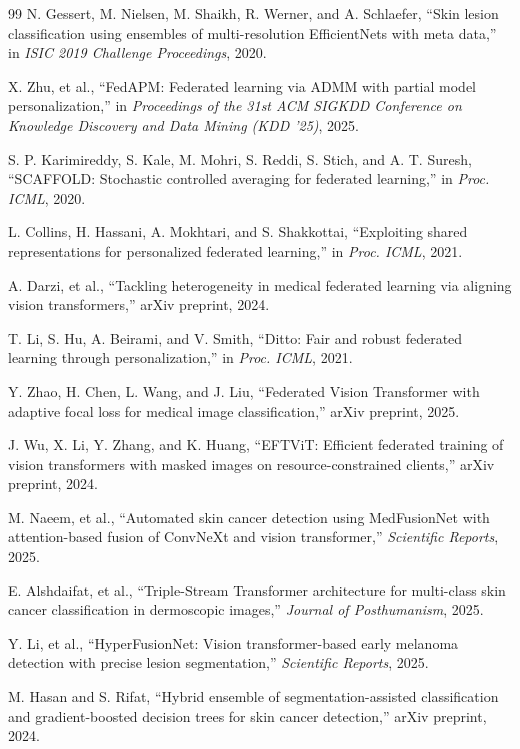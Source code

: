 \documentclass[utf8]{FrontiersinHarvard} %
\begin{document}
\begin{thebibliography}{99}
N. Gessert, M. Nielsen, M. Shaikh, R. Werner, and A. Schlaefer,
“Skin lesion classification using ensembles of multi-resolution EfficientNets with meta data,”
in \emph{ISIC 2019 Challenge Proceedings}, 2020.

X. Zhu, et al.,
“FedAPM: Federated learning via ADMM with partial model personalization,”
in \emph{Proceedings of the 31st ACM SIGKDD Conference on Knowledge Discovery and Data Mining (KDD ’25)}, 2025.

S. P. Karimireddy, S. Kale, M. Mohri, S. Reddi, S. Stich, and A. T. Suresh,
“SCAFFOLD: Stochastic controlled averaging for federated learning,”
in \emph{Proc. ICML}, 2020.

L. Collins, H. Hassani, A. Mokhtari, and S. Shakkottai,
“Exploiting shared representations for personalized federated learning,”
in \emph{Proc. ICML}, 2021.

A. Darzi, et al.,
“Tackling heterogeneity in medical federated learning via aligning vision transformers,”
arXiv preprint, 2024.

T. Li, S. Hu, A. Beirami, and V. Smith,
“Ditto: Fair and robust federated learning through personalization,”
in \emph{Proc. ICML}, 2021.

Y. Zhao, H. Chen, L. Wang, and J. Liu,
“Federated Vision Transformer with adaptive focal loss for medical image classification,”
arXiv preprint, 2025.

J. Wu, X. Li, Y. Zhang, and K. Huang,
“EFTViT: Efficient federated training of vision transformers with masked images on resource-constrained clients,”
arXiv preprint, 2024.

M. Naeem, et al.,
“Automated skin cancer detection using MedFusionNet with attention-based fusion of ConvNeXt and vision transformer,”
\emph{Scientific Reports}, 2025.

E. Alshdaifat, et al.,
“Triple-Stream Transformer architecture for multi-class skin cancer classification in dermoscopic images,”
\emph{Journal of Posthumanism}, 2025.

Y. Li, et al.,
“HyperFusionNet: Vision transformer-based early melanoma detection with precise lesion segmentation,”
\emph{Scientific Reports}, 2025.

M. Hasan and S. Rifat,
“Hybrid ensemble of segmentation-assisted classification and gradient-boosted decision trees for skin cancer detection,”
arXiv preprint, 2024.


\end{thebibliography}
\end{document}
